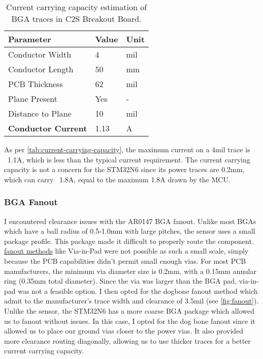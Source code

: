 \documentclass[10pt]{article}
\begin{document}
\begin{table}[H]
\centering
\begin{tabular}{|l|l|l|}
    \hline
\textbf{Parameter} & \textbf{Value} & \textbf{Unit} \\
\hline
Conductor Width & 4 & mil \\
\hline
Conductor Length & 50 & mm \\
\hline
PCB Thickness & 62 & mil \\
\hline
Plane Present & Yes & - \\
\hline
Distance to Plane & 10 & mil \\
\hline
\hline
\textbf{Conductor Current} & 1.13 & A \\
\hline
\end{tabular}
\caption{Current carrying capacity estimation of BGA traces in C2S Breakout Board.}
\label{tab:current-carrying-capacity}
\end{table}

As per \autoref{tab:current-carrying-capacity}, the maximum current on a 4mil trace is ~1.1A, which is less than the typical current requirement. The current carrying capacity is not a concern for the STM32N6 since its power traces are 0.2mm, which can carry ~1.8A, equal to the maximum 1.8A drawn by the MCU.

\subsubsection{BGA Fanout}
I encountered clearance issues with the AR0147 BGA fanout. Unlike most BGAs which have a ball radius of 0.5-1.0mm with large pitches, the sensor uses a small package profile. This package made it difficult to properly route the component.
\href{https://resources.altium.com/p/which-bga-pad-and-fanout-strategy-right-your-pcb}{fanout methods} like Via-in-Pad were not possible as such a small scale, simply because the PCB capabilities didn't permit small enough vias.
For most PCB manufacturers, the minimum via diameter size is 0.2mm, with a 0.15mm annular ring (0.35mm total diameter). Since the via was larger than the BGA pad, via-in-pad was not a feasible option.
I then opted for the dogbone fanout method which admit to the manufacturer's trace width and clearance of 3.5mil (see \autoref{fig:fanout}). Unlike the sensor, the STM32N6 has a more coarse BGA package which allowed us to fanout without issues. In this case, I opted for the dog bone fanout since it allowed us to place our ground vias closer to the power vias. It also provided more clearance routing diagonally, allowing us to use thicker traces for a better current carrying capacity.
\end{document}
